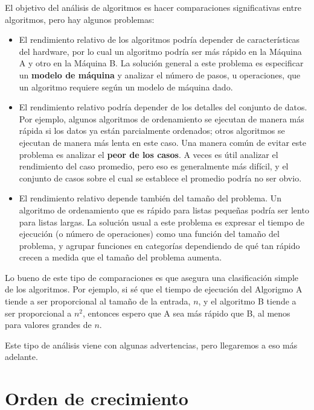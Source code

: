 \documentclass[10pt]{book}
\begin{document}
El objetivo del análisis de algoritmos es hacer comparaciones
significativas entre algoritmos, pero hay algunos problemas:

\begin{itemize}

\item El rendimiento relativo de los algoritmos podría
depender de características del hardware, por lo cual un algoritmo
podría ser más rápido en la Máquina A y otro en la Máquina B.
La solución general a este problema es especificar un
{\bf modelo de máquina} y analizar el número de pasos, u
operaciones, que un algoritmo requiere según un modelo de máquina dado.

\item El rendimiento relativo podría depender de los detalles del
conjunto de datos.  Por ejemplo, algunos algoritmos
de ordenamiento se ejecutan de manera más rápida si los datos ya están parcialmente ordenados;
otros algoritmos se ejecutan de manera más lenta en este caso.
Una manera común de evitar este problema es analizar el
{\bf peor de los casos}.  A veces es útil
analizar el rendimiento del caso promedio, pero eso es generalmente más difícil,
y el conjunto de casos sobre el cual se establece el promedio podría no ser obvio.

\item El rendimiento relativo depende también del tamaño del
problema.  Un algoritmo de ordenamiento que es rápido para listas pequeñas
podría ser lento para listas largas.
La solución usual a este problema es expresar el tiempo de ejecución
(o número de operaciones) como una función del tamaño del problema,
y agrupar funciones en categorías dependiendo de qué tan rápido
crecen a medida que el tamaño del problema aumenta.

\end{itemize}

Lo bueno de este tipo de comparaciones es que asegura
una clasificación simple de los algoritmos.  Por ejemplo,
si sé que el tiempo de ejecución del Algorigmo A tiende a ser
proporcional al tamaño de la entrada, $n$, y el algoritmo B
tiende a ser proporcional a $n^2$, entonces
espero que A sea más rápido que B, al menos para valores grandes de $n$.

Este tipo de análisis viene con algunas advertencias, pero llegaremos
a eso más adelante.


\section{Orden de crecimiento}
\end{document}
